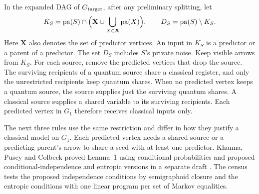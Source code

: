 In the expanded DAG of \(G_{\text{target}}\), after any preliminary splitting, let
\[
 K_S=\operatorname{pa}(S)\cap\Bigl(\mathbf X\cup\bigcup_{X\in\mathbf X}\operatorname{pa}(X)\Bigr),
 \qquad D_S=\operatorname{pa}(S)\setminus K_S .
\]
Here \(\mathbf X\) also denotes the set of predictor vertices. An input
in \(K_S\) is a predictor or a parent of a predictor. The set \(D_S\)
includes \(S\)'s private noise. Keep visible arrows from \(K_S\). For
each source, remove the predicted vertices that drop the source. The
surviving recipients of a quantum source share a classical register,
and only the unrestricted recipients keep quantum shares. When no
predicted vertex keeps a quantum source, the source supplies just the
surviving quantum shares. A classical source supplies a shared variable
to its surviving recipients. Each predicted vertex in \(G_1\) therefore
receives classical inputs only.

The next three rules use the same restriction and differ in how they
justify a classical model on \(G_1\). Each predicted vertex needs a
shared source or a predicting parent's arrow to share a seed with at
least one predictor. Khanna, Pusey and Colbeck proved Lemma~1 using
conditional probabilities \cite{KPC} and proposed conditional-independence
and entropic versions in a separate draft \cite{KPCdraft}.
The census tests the proposed independence conditions by semigraphoid
closure and the entropic conditions with one linear program per set of
Markov equalities.

